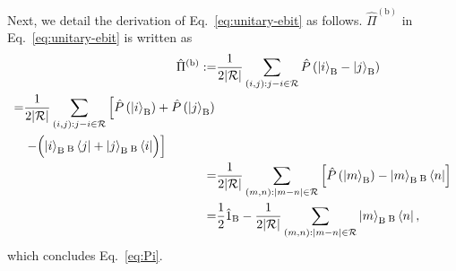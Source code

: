 \documentclass[twocolumn,superscriptaddress,pra,footinbib,notitlepage]{revtex4-1}
\newcommand{\1}{\mbox{1}\hspace{-0.25em}\mbox{l}}
\newcommand{\abs}[1]{\lvert#1\rvert}
\begin{document}
Next, we detail the derivation of Eq.~\eqref{eq:unitary-ebit} as follows. $\hat{\Pi}^{(\textrm{b})}$ in Eq.~\eqref{eq:unitary-ebit} is written as
\begin{align}
\hat{\Pi}^{(\textrm{b})}:=&\frac{1}{2\abs{\mathcal{R}}}\sum_{(i, j):j-i\in\mathcal{R}}\hat{P}\left(\ket{i}_\textrm{B}-\ket{j}_\textrm{B}\right)\nonumber\\
\begin{split}
=&\frac{1}{2\abs{\mathcal{R}}}\sum_{(i, j):j-i\in\mathcal{R}}\left[\hat{P}\left(\ket{i}_\textrm{B}\right)+\hat{P}\left(\ket{j}_\textrm{B}\right)\right.\\
&\left.-\Bigl(\ket{i}_\textrm{B}{}_\textrm{B}\bra{j}+\ket{j}_\textrm{B}{}_\textrm{B}\bra{i}\Bigr)\right]
\end{split}\nonumber\\
=&\frac{1}{2\abs{\mathcal{R}}}\sum_{(m, n):\abs{m-n}\in\mathcal{R}}\left[\hat{P}\left(\ket{m}_\textrm{B}\right)-\ket{m}_\textrm{B}{}_\textrm{B}\bra{n}\right]\nonumber\\
=&\frac{1}{2}\hat{1}_\textrm{B}-\frac{1}{2\abs{\mathcal{R}}}\sum_{(m, n):\abs{m-n}\in\mathcal{R}}\ket{m}_\textrm{B}{}_\textrm{B}\bra{n},
\end{align}
which concludes Eq.~\eqref{eq:Pi}.
\end{document}
